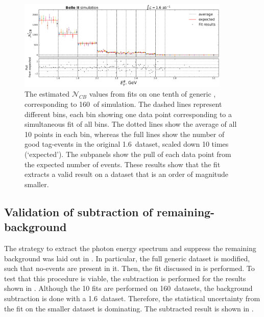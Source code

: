 \begin{figure}[htbp!]
    \includegraphics[width=0.9\textwidth]{figures/mc_validation/extracted_signal_generic_mc.pdf}
    \caption{\label{fig:extracted_validation_mc}The estimated $\mathcal{N}_{CB}$ values from fits on one tenth of generic \MC, corresponding to 160~\invfb of simulation.
    The dashed lines represent different \EB bins, each bin showing one data point corresponding to a simultaneous fit of all \EB bins.
    The dotted lines show the average of all 10 points in each bin, whereas the full lines show the number of good tag-\B events in the original 1.6~\invab dataset, scaled down 10 times (`expected').
    The subpanels show the pull of each data point from the expected number of events.
    These results show that the fit extracts a valid result on a dataset that is an order of magnitude smaller.
    }
\end{figure}

\subsection{Validation of subtraction of remaining-\texorpdfstring{\BB}{BB} background}\label{sec:background_subtraction_validation_mc}

The strategy to extract the \BtoXsgamma photon energy spectrum and suppress the remaining \BB background was laid out in .
In particular, the full generic \MC dataset is modified, such that no-\BtoXsgamma events are present in it.
Then, the \Mbc fit discussed in  is performed.
To test that this procedure is viable, the subtraction is performed for the results shown in .
Although the 10 fits are performed on 160~\invfb datasets, the background subtraction is done with a 1.6~\invab dataset.
Therefore, the statistical uncertainty from the fit on the smaller dataset is dominating.
The subtracted result is shown in .

